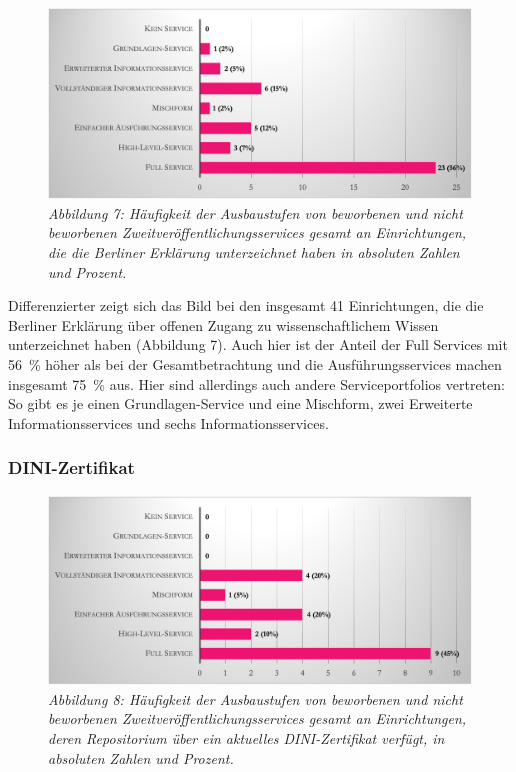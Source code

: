 \documentclass[a4paper,
fontsize=11pt,
oneside,
numbers=noperiodatend,
parskip=half-,
bibliography=totoc,
final
]{scrartcl}
\begin{document}
\begin{figure}[h!]
\centering
\includegraphics[width=.9\textwidth]{img/abb7.png}
\caption{\textit{Abbildung 7: Häufigkeit der Ausbaustufen von beworbenen und
nicht beworbenen Zweitveröffentlichungsservices gesamt an Einrichtungen,
die die Berliner Erklärung unterzeichnet haben in absoluten Zahlen und
Prozent.}}
\end{figure}

Differenzierter zeigt sich das Bild bei den insgesamt 41 Einrichtungen,
die die Berliner Erklärung über offenen Zugang zu wissenschaftlichem
Wissen unterzeichnet haben (Abbildung 7). Auch hier ist der Anteil der
Full Services mit 56~\% höher als bei der Gesamtbetrachtung und die
Ausführungsservices machen insgesamt 75~\% aus. Hier sind allerdings
auch andere Serviceportfolios vertreten: So gibt es je einen
Grundlagen-Service und eine Mischform, zwei Erweiterte
Informationsservices und sechs Informationsservices.

\hypertarget{dini-zertifikat}{%
\subsubsection{DINI-Zertifikat}\label{dini-zertifikat}}

\begin{figure}[h!]
\centering
\includegraphics[width=.9\textwidth]{img/abb8.png}
\caption{\textit{Abbildung 8: Häufigkeit der Ausbaustufen von beworbenen und
nicht beworbenen Zweitveröffentlichungsservices gesamt an Einrichtungen,
deren Repositorium über ein aktuelles DINI-Zertifikat verfügt, in
absoluten Zahlen und Prozent.}}
\end{figure}
\end{document}
